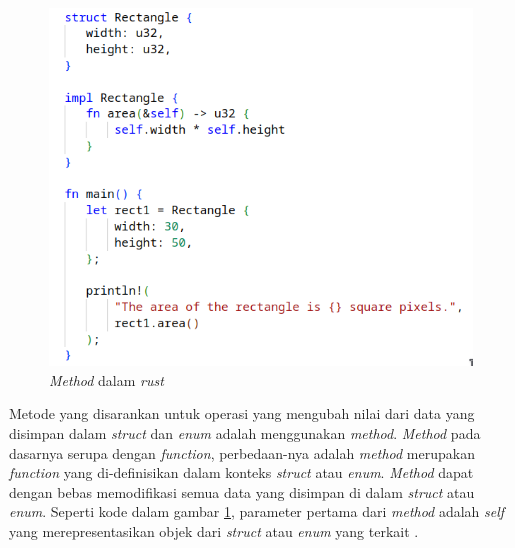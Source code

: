 \begin{figure}[H]
  \centering
  \includegraphics[keepaspectratio, width=12cm]{gambar/rust-struct-method.png}
  \caption{\emph{Method} dalam \emph{rust} \citep{rustbook}}
  \label{gambar:method-struct-rust}
\end{figure}

Metode yang disarankan untuk operasi yang mengubah nilai dari data yang disimpan dalam \emph{struct} dan \emph{enum} adalah menggunakan \emph{method}. \emph{Method} pada dasarnya serupa dengan \emph{function}, perbedaan-nya adalah \emph{method} merupakan \emph{function} yang di-definisikan dalam konteks \emph{struct} atau \emph{enum}. \emph{Method} dapat dengan bebas memodifikasi semua data yang disimpan di dalam \emph{struct} atau \emph{enum}. Seperti kode dalam gambar \ref{gambar:method-struct-rust}, parameter pertama dari \emph{method} adalah \emph{self} yang merepresentasikan objek dari \emph{struct} atau \emph{enum} yang terkait \citep{rustbook}.

